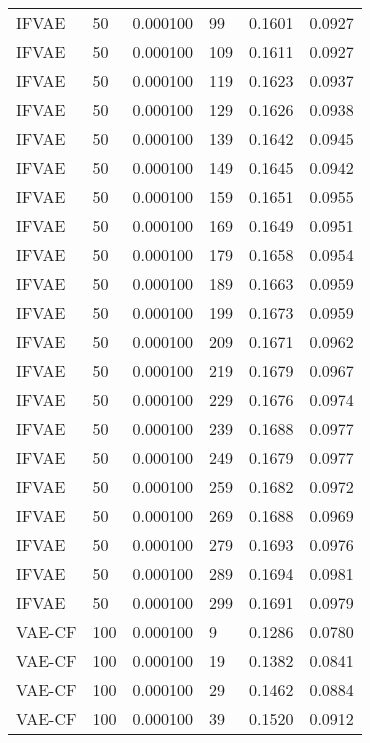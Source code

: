 \begin{tabular}{llrlrr}
   IFVAE &   50 &  0.000100 &    99 &  0.1601 &       0.0927 \\
   IFVAE &   50 &  0.000100 &   109 &  0.1611 &       0.0927 \\
   IFVAE &   50 &  0.000100 &   119 &  0.1623 &       0.0937 \\
   IFVAE &   50 &  0.000100 &   129 &  0.1626 &       0.0938 \\
   IFVAE &   50 &  0.000100 &   139 &  0.1642 &       0.0945 \\
   IFVAE &   50 &  0.000100 &   149 &  0.1645 &       0.0942 \\
   IFVAE &   50 &  0.000100 &   159 &  0.1651 &       0.0955 \\
   IFVAE &   50 &  0.000100 &   169 &  0.1649 &       0.0951 \\
   IFVAE &   50 &  0.000100 &   179 &  0.1658 &       0.0954 \\
   IFVAE &   50 &  0.000100 &   189 &  0.1663 &       0.0959 \\
   IFVAE &   50 &  0.000100 &   199 &  0.1673 &       0.0959 \\
   IFVAE &   50 &  0.000100 &   209 &  0.1671 &       0.0962 \\
   IFVAE &   50 &  0.000100 &   219 &  0.1679 &       0.0967 \\
   IFVAE &   50 &  0.000100 &   229 &  0.1676 &       0.0974 \\
   IFVAE &   50 &  0.000100 &   239 &  0.1688 &       0.0977 \\
   IFVAE &   50 &  0.000100 &   249 &  0.1679 &       0.0977 \\
   IFVAE &   50 &  0.000100 &   259 &  0.1682 &       0.0972 \\
   IFVAE &   50 &  0.000100 &   269 &  0.1688 &       0.0969 \\
   IFVAE &   50 &  0.000100 &   279 &  0.1693 &       0.0976 \\
   IFVAE &   50 &  0.000100 &   289 &  0.1694 &       0.0981 \\
   IFVAE &   50 &  0.000100 &   299 &  0.1691 &       0.0979 \\
  VAE-CF &  100 &  0.000100 &     9 &  0.1286 &       0.0780 \\
  VAE-CF &  100 &  0.000100 &    19 &  0.1382 &       0.0841 \\
  VAE-CF &  100 &  0.000100 &    29 &  0.1462 &       0.0884 \\
  VAE-CF &  100 &  0.000100 &    39 &  0.1520 &       0.0912 \\

\end{tabular}
